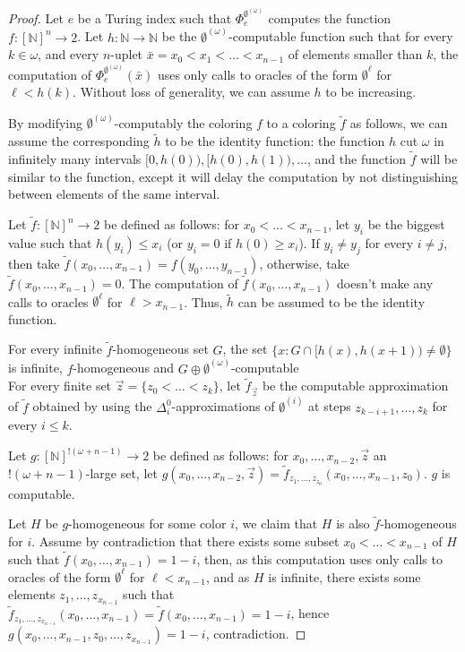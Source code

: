 \documentclass{article}
\newcommand{\NN}[0]{\mathbb{N}}
\numberwithin{theorem}{section}
\begin{document}
\begin{proof}
Let $e$ be a Turing index such that $\Phi_e^{\emptyset^{(\omega)}}$ computes the function $f : [\NN]^n \to 2$. Let $h : \NN \to \NN$ be the $\emptyset^{(\omega)}$-computable function such that for every $k \in \omega$, and every $n$-uplet $\bar{x} = x_0 < x_1 < \dots < x_{n-1}$ of elements smaller than $k$, the computation of $\Phi_e^{\emptyset^{(\omega)}}(\bar{x})$ uses only calls to oracles of the form $\emptyset^{\ell}$ for $\ell < h(k)$. Without loss of generality, we can assume $h$ to be increasing.  

By modifying $\emptyset^{(\omega)}$-computably the coloring $f$ to a coloring $\tilde{f}$ as follows, we can assume the corresponding $\tilde{h}$ to be the identity function: the function $h$ cut $\omega$ in infinitely many intervals $[0,h(0)), [h(0),h(1)), \dots$, and the function $\tilde{f}$ will be similar to the function, except it will delay the computation by not distinguishing between elements of the same interval.

Let $\tilde{f} : [\NN]^n \to 2$ be defined as follows: for $x_0 < \dots < x_{n-1}$, let $y_i$ be the biggest value such that $h(y_i) \leq x_i$ (or $y_i = 0$ if $h(0) \geq x_i$). If $y_i \neq y_j$ for every $i \neq j$, then take $\tilde{f}(x_0, \dots, x_{n-1}) = f(y_0, \dots, y_{n-1})$, otherwise, take $\tilde{f}(x_0, \dots, x_{n-1}) = 0$. The computation of $\tilde{f}(x_0, \dots, x_{n-1})$ doesn't make any calls to oracles $\emptyset^{\ell}$ for $\ell > x_{n-1}$. Thus, $\tilde{h}$ can be assumed to be the identity function. 

For every infinite $\tilde{f}$-homogeneous set $G$, the set $\{x : G \cap [h(x),h(x+1)) \neq \emptyset\}$ is infinite, $f$-homogeneous and $G \oplus \emptyset^{(\omega)}$-computable
\\

For every finite set $\vec{z} = \{z_0 < \dots < z_k\}$, let $\tilde{f}_{\vec{z}}$ be the computable approximation of $\tilde{f}$ obtained by using the $\Delta_i^0$-approximations of $\emptyset^{(i)}$ at steps $z_{k-i+1}, \dots, z_k$ for every $i \leq k$. 

Let $g : [\NN]^{!(\omega + n - 1)} \to 2$ be defined as follows: for $x_0, \dots, x_{n-2}, \vec{z}$ an $!(\omega + n - 1)$-large set, let $g(x_0, \dots, x_{n-2}, \vec{z}) = \tilde{f}_{z_1, \dots, z_{z_0}}(x_0, \dots, x_{n-1}, z_0)$. $g$ is computable.

Let $H$ be $g$-homogeneous for some color $i$, we claim that $H$ is also $\tilde{f}$-homogeneous for $i$. Assume by contradiction that there exists some subset $x_0 < \dots < x_{n-1}$ of $H$ such that $\tilde{f}(x_0, \dots, x_{n-1}) = 1 - i$, then, as this computation uses only calls to oracles of the form $\emptyset^{\ell}$ for $\ell < x_{n-1}$, and as $H$ is infinite, there exists some elements $z_1, \dots, z_{x_{n-1}}$ such that $\tilde{f}_{z_1, \dots, z_{x_{n-1}}}(x_0, \dots, x_{n-1}) = \tilde{f}(x_0, \dots, x_{n-1}) = 1 - i$, hence $g(x_0, \dots, x_{n-1}, z_0, \dots, z_{x_{n-1}}) = 1 - i$, contradiction.
\end{proof}
\end{document}
